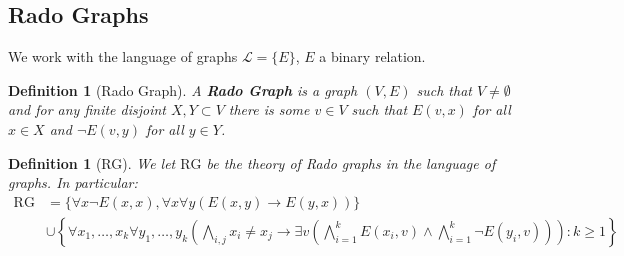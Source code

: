 \documentclass[]{article}
\theoremstyle{custhm}
\theoremstyle{cusdef}
\newtheorem{defin}[theorem]{Definition}
\theoremstyle{custhm}
\theoremstyle{custhm}
\theoremstyle{custhm}
\theoremstyle{ex}
\theoremstyle{custhm}
\theoremstyle{cusdef}
\theoremstyle{remark}
\newcommand{\ra}{\rightarrow}
\newcommand{\undf}[1]{\textit{\textbf{#1}}}
\renewcommand{\L}{\mathcal{L}}
\newcommand{\rg}{\textrm{RG}}
\begin{document}
\subsection*{Rado Graphs}

We work with the language of graphs $\L = \{E\}$, $E$ a binary relation.

\begin{defin}[Rado Graph]
A \undf{Rado Graph} is a graph $(V,E)$ such that $V\ne \emptyset$ and for any finite disjoint $X,Y\subset V$ there is some $v\in V$ such that $E(v,x)$ for all $x\in X$ and $\neg E(v,y)$ for all $y\in Y$.
\end{defin}
\begin{defin}[RG]
We let $\rg$ be the theory of Rado graphs in the language of graphs. In particular:
\begin{align*}
	\rg &= \{ \forall x \neg E(x,x),\forall x\forall y(E(x,y)\ra E(y,x)) \}\\
		&\cup \left\lbrace \forall x_1,\dots,x_k\forall y_1,\dots,y_k\left(\bigwedge_{i,j}x_i\ne x_j \ra \exists v\left(\bigwedge_{i=1}^{k}E(x_i,v) \land \bigwedge_{i=1}^{k}\neg E(y_i,v)\right)\right):k\ge 1\right\rbrace
\end{align*}
\end{defin}
\end{document}
